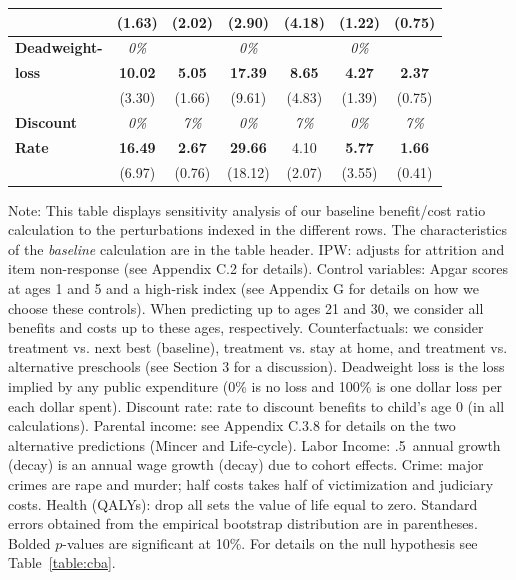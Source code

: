 \documentclass[static]{JJH-Beamer}
\begin{document}
\begin{frame}
\begin{table}[H]
\begin{center}
{\begin{tabular}{>{\bfseries}lcc|cc|cc}
	&	(1.63)	&	(2.02)	&	(2.90)	&	(4.18)	&	(1.22)	&	(0.75)	\\ \midrule
Deadweight-	&	\textit{0\%}	&	\textit{100\%\textit}	&	\textit{0\%}	&	\textit{100\%\textit}	&	\textit{0\%}	&	\textit{100\%\textit}	\\
loss	&	\textbf{10.02}	&	\textbf{5.05}	&	\textbf{17.39}	&	\textbf{8.65}	&	\textbf{4.27}	&	\textbf{2.37}	\\
	&	(3.30)	&	(1.66)	&	(9.61)	&	(4.83)	&	(1.39)	&	(0.75)	\\ \midrule
Discount 	&	\textit{0\%}	&	\textit{7\%}	&	\textit{0\%}	&	\textit{7\%}	&	\textit{0\%}	&	\textit{7\%}	\\
Rate	&	\textbf{16.49}	&	\textbf{2.67}	&	\textbf{29.66}	&	4.10	&	\textbf{5.77}	&	\textbf{1.66}	\\
	&	(6.97)	&	(0.76)	&	(18.12)	&	(2.07)	&	(3.55)	&	(0.41)	\\
\bottomrule
\end{tabular}
}
\end{center}
\end{table}

\end{frame}

{\flushleft \small Note: This table displays sensitivity analysis of our baseline benefit/cost ratio calculation to the perturbations indexed in the different rows. The characteristics of the \textit{baseline} calculation are in the table header. IPW: adjusts for attrition and item non-response (see Appendix C.2 for details). Control variables: Apgar scores at ages 1 and 5 and a high-risk index (see Appendix G for details on how we choose these controls). When predicting up to ages 21 and 30, we consider all benefits and costs up to these ages, respectively. Counterfactuals: we consider treatment vs. next best (baseline), treatment vs. stay at home, and treatment vs. alternative preschools (see Section 3 for a discussion). Deadweight loss is the loss implied by any public expenditure (0\% is no loss and 100\% is one dollar loss per each dollar spent). Discount rate: rate to discount benefits to child's age 0 (in all calculations). Parental income: see Appendix C.3.8 for details on the two alternative predictions (Mincer and Life-cycle). Labor Income: .5\ annual growth (decay) is an annual wage growth (decay) due to cohort effects. Crime: major crimes are rape and murder; half costs takes half of victimization and judiciary costs. Health (QALYs): drop all sets the value of life equal to zero. Standard errors obtained from the empirical bootstrap distribution are in parentheses. Bolded $p$-values are significant at 10\%. For details on the null hypothesis see Table~\ref{table:cba}.\\}
\end{document}
